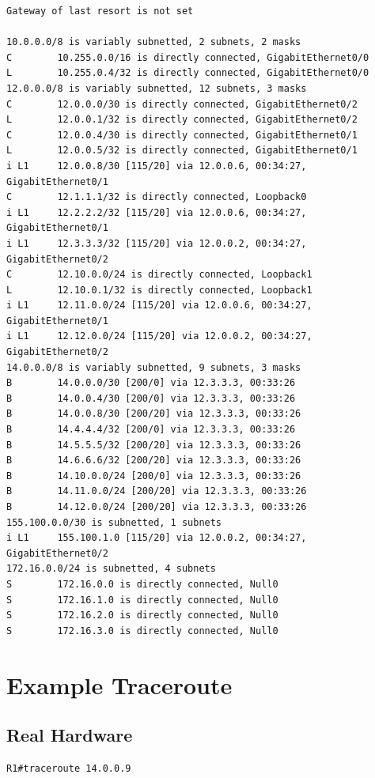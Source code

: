 \documentclass[11pt]{report}
\begin{document}
\begin{appendices}
\begin{lstlisting}
Gateway of last resort is not set

10.0.0.0/8 is variably subnetted, 2 subnets, 2 masks
C        10.255.0.0/16 is directly connected, GigabitEthernet0/0
L        10.255.0.4/32 is directly connected, GigabitEthernet0/0
12.0.0.0/8 is variably subnetted, 12 subnets, 3 masks
C        12.0.0.0/30 is directly connected, GigabitEthernet0/2
L        12.0.0.1/32 is directly connected, GigabitEthernet0/2
C        12.0.0.4/30 is directly connected, GigabitEthernet0/1
L        12.0.0.5/32 is directly connected, GigabitEthernet0/1
i L1     12.0.0.8/30 [115/20] via 12.0.0.6, 00:34:27, GigabitEthernet0/1
C        12.1.1.1/32 is directly connected, Loopback0
i L1     12.2.2.2/32 [115/20] via 12.0.0.6, 00:34:27, GigabitEthernet0/1
i L1     12.3.3.3/32 [115/20] via 12.0.0.2, 00:34:27, GigabitEthernet0/2
C        12.10.0.0/24 is directly connected, Loopback1
L        12.10.0.1/32 is directly connected, Loopback1
i L1     12.11.0.0/24 [115/20] via 12.0.0.6, 00:34:27, GigabitEthernet0/1
i L1     12.12.0.0/24 [115/20] via 12.0.0.2, 00:34:27, GigabitEthernet0/2
14.0.0.0/8 is variably subnetted, 9 subnets, 3 masks
B        14.0.0.0/30 [200/0] via 12.3.3.3, 00:33:26
B        14.0.0.4/30 [200/0] via 12.3.3.3, 00:33:26
B        14.0.0.8/30 [200/20] via 12.3.3.3, 00:33:26
B        14.4.4.4/32 [200/0] via 12.3.3.3, 00:33:26
B        14.5.5.5/32 [200/20] via 12.3.3.3, 00:33:26
B        14.6.6.6/32 [200/20] via 12.3.3.3, 00:33:26
B        14.10.0.0/24 [200/0] via 12.3.3.3, 00:33:26
B        14.11.0.0/24 [200/20] via 12.3.3.3, 00:33:26
B        14.12.0.0/24 [200/20] via 12.3.3.3, 00:33:26
155.100.0.0/30 is subnetted, 1 subnets
i L1     155.100.1.0 [115/20] via 12.0.0.2, 00:34:27, GigabitEthernet0/2
172.16.0.0/24 is subnetted, 4 subnets
S        172.16.0.0 is directly connected, Null0
S        172.16.1.0 is directly connected, Null0
S        172.16.2.0 is directly connected, Null0
S        172.16.3.0 is directly connected, Null0
\end{lstlisting}

\section{Example Traceroute}

\subsection{Real Hardware}

\begin{lstlisting}
R1#traceroute 14.0.0.9


\end{lstlisting}
\end{appendices}
\end{document}
